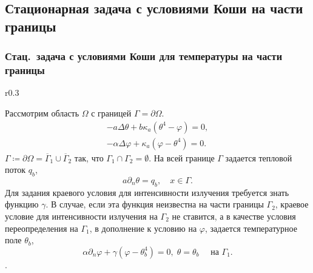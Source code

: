 \subsection{Стационарная задача с условиями Коши на части границы}\label{subsec:st-koshi}
\begin{frame}
    \frametitle{Стац.\ задача с условиями Коши для температуры на части границы}
        \begin{wrapfigure}{r}{0.3\textwidth}
    \end{wrapfigure}
    Рассмотрим область $\Omega$ с границей $\Gamma=\partial\Omega$.
    \begin{gather}
        \label{eq:2_4:eq1}
        - a\Delta\theta + b\kappa_a(\theta^4 - \varphi) = 0,   \\
        -\alpha \Delta \varphi + \kappa_a(\varphi- \theta^4) = 0.
    \end{gather}
    $\Gamma \coloneqq \partial \Omega =\overline{\Gamma}_1 \cup \overline{\Gamma}_2$
    так, что $\Gamma_1 \cap \Gamma_2 =  \emptyset$.
    На всей границе $\Gamma$ задается тепловой поток $q_b$,
    \begin{equation}
        \label{eq:2_4:bc1}
        a\partial_n\theta = q_b, \quad x\in \Gamma.
    \end{equation}
    Для задания краевого условия для интенсивности излучения требуется знать функцию $\gamma$.
    В случае, если эта функция неизвестна на части границы $\Gamma_2$,
    краевое условие для интенсивности излучения на $\Gamma_2$ не ставится, а в качестве условия
    переопределения на $\Gamma_1$, в дополнение к условию на
    $\varphi$, задается температурное поле $\theta_b$,
    \begin{equation}
        \label{eq:2_4:bc2}
        \alpha\partial_n\varphi + \gamma (\varphi - \theta_b ^4 ) = 0,\;
        \theta=\theta_b\quad \text{ на } \Gamma_1.
    \end{equation}.

\end{frame}

